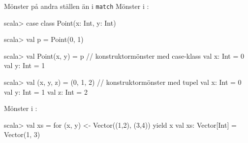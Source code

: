 \begin{Slide}{Mönster på andra ställen än i \texttt{match}}\SlideFontSmall
Mönster i :
\vspace{-0.25em}\begin{REPL}
scala> case class Point(x: Int, y: Int)

scala> val p = Point(0, 1)

scala> val Point(x, y) = p          // konstruktormönster med case-klass
val x: Int = 0
val y: Int = 1

scala> val (x, y, z) = (0, 1, 2)    // konstruktormönster med tupel
val x: Int = 0
val y: Int = 1
val z: Int = 2

\end{REPL}
Mönster i :
\vspace{-0.25em}\begin{REPL}
scala> val xs = for (x, y) <- Vector((1,2), (3,4)) yield x
val xs: Vector[Int] = Vector(1, 3)
\end{REPL}
\end{Slide}

